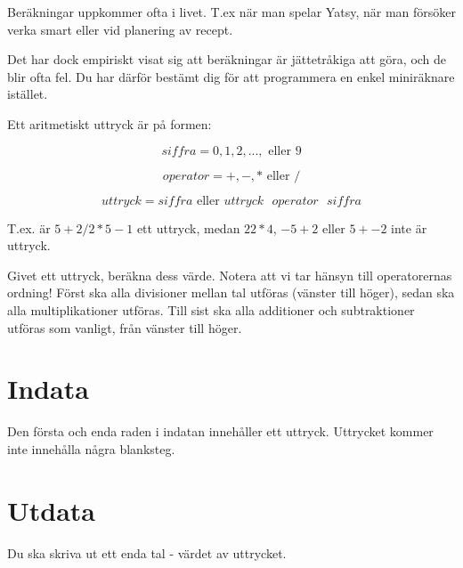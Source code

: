 
Beräkningar uppkommer ofta i livet. T.ex när man spelar Yatsy, när man försöker verka smart eller vid planering av recept.

Det har dock empiriskt visat sig att beräkningar är jättetråkiga att göra, och de blir ofta fel. Du har därför
bestämt dig för att programmera en enkel miniräknare istället.

Ett aritmetiskt uttryck är på formen:

$$siffra = 0, 1, 2, ..., \text{ eller } 9$$

$$operator = +, -, * \text{ eller } /$$

$$uttryck = siffra \text{ eller } uttryck \text{ } operator \text{ } siffra$$

T.ex. är $5 + 2 / 2 * 5 - 1$ ett uttryck, medan $22 * 4$, $-5 + 2$ eller $5 + - 2$ inte är uttryck.

Givet ett uttryck, beräkna dess värde. Notera att vi tar hänsyn till operatorernas ordning! Först ska alla divisioner mellan tal utföras (vänster till höger), sedan ska alla multiplikationer utföras. Till sist ska alla additioner och subtraktioner utföras som vanligt, från vänster till höger.

\section*{Indata}
Den första och enda raden i indatan innehåller ett uttryck. Uttrycket kommer inte innehålla några blanksteg.

\section*{Utdata}
Du ska skriva ut ett enda tal - värdet av uttrycket.
